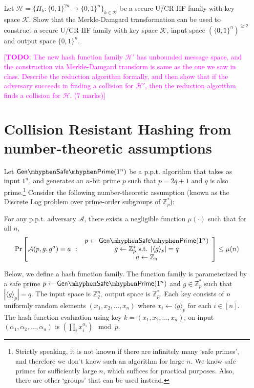 \documentclass[10pt,addpoints]{exam}
\newcommand{\Z}{\mathbb{Z}}
\newcommand{\subgrp}[2]{\langle #1 \rangle_{#2}}
\newcommand{\calA}{\mathcal{A}}
\newcommand{\calH}{\mathcal{H}}
\newcommand{\calK}{\mathcal{K}}
\newcommand{\zpst}{\mathbb{Z}_p^*}
\newcommand{\bit}{\{0,1\}}
\newcommand{\gensafeprime}{\mathsf{Gen\mhyphen Safe\mhyphen Prime}}
\newcommand{\TODO}[1]{\textcolor{magenta}{[\textbf{TODO}: #1]}}
\theoremstyle{definition}
\begin{document}
    Let $\calH = \{H_k:\bit^{2n} \to \bit^n\}_{k \in \calK}$ be a secure U/CR-HF family with key space $\calK$. Show that the Merkle-Damgard transformation can be used to construct a secure U/CR-HF family with key space $\calK$, input space $(\bit^n)^{\geq 2}$ and output space $\bit^n$. 

    \vspace{10pt}
    
    \noindent\TODO{The new hash function family $\calH'$ has unbounded message space, and the construction via Merkle-Damgard transform is same as the one we saw in class. Describe the reduction algorithm formally, and then show that if the adversary succeeds in finding a collision for $\calH'$, then the reduction algorithm finds a collision for $\calH$. (7 marks)}


    \newpage

    \color{blue}
    \section{Collision Resistant Hashing from number-theoretic assumptions}

    Let $\gensafeprime(1^n)$ be a p.p.t. algorithm that takes as input $1^n$, and generates an $n$-bit prime $p$ such that $p=2q+1$ and $q$ is also prime.\footnote{Strictly speaking, it is not known if there are infinitely many `safe primes', and therefore we don't know such an algorithm for large $n$. We know safe primes for sufficiently large $n$, which suffices for practical purposes. Also, there are other `groups' that can be used instead.} Consider the following number-theoretic assumption (known as the Discrete Log problem over prime-order subgroups of $\zpst$): 

    For any p.p.t. adversary $\calA$, there exists a negligible function $\mu(\cdot)$ such that for all $n$,
    \[
        \Pr
        \left[\calA(p, g, g^a) = a ~:~ 
        \begin{array}{c}
        p \gets \gensafeprime(1^n) \\
        g \gets \zpst \text{ s.t. } |\subgrp{g}{p}| = q \\
        a \gets \Z_q
        \end{array}
        \right]\leq \mu(n)
    \]

    Below, we define a hash function family. The function family is parameterized by a safe prime $p \gets \gensafeprime(1^n)$ and $g \in \zpst$ such that $|\subgrp{g}{p}| = q$. The input space is $\Z_q^n$, output space is $\zpst$. Each key consists of $n$ uniformly random elements $(x_1, x_2, \ldots, x_n)$ where $x_i \gets \subgrp{g}{p}$ for each $i\in [n]$. The hash function evaluation using key $k = (x_1, x_2, \ldots, x_n)$, on input $(\alpha_1, \alpha_2, \ldots, \alpha_n)$ is $(\prod_i x_i^{\alpha_i}) \mod p$. 
\end{document}
